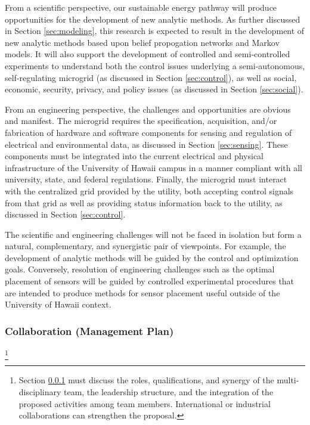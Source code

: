 From a scientific perspective, our sustainable energy pathway will produce
opportunities for the development of new analytic methods.  As further
discussed in Section \ref{sec:modeling}, this research is expected to
result in the development of new analytic methods based upon belief
propogation networks and Markov models.  It will also support the
development of controlled and semi-controlled experiments to understand both
the control issues underlying a semi-autonomous, self-regulating microgrid
(as discussed in Section \ref{sec:control}), as well as social, economic,
security, privacy, and policy issues (as discussed in Section \ref{sec:social}).

From an engineering perspective, the challenges and opportunities are
obvious and manifest.  The microgrid requires the specification,
acquisition, and/or fabrication of hardware and software components for
sensing and regulation of electrical and environmental data, as discussed
in Section \ref{sec:sensing}. These components must be integrated into the
current electrical and physical infrastructure of the University of Hawaii
campus in a manner compliant with all university, state, and federal
regulations.  Finally, the microgrid must interact with the centralized
grid provided by the utility, both accepting control signals from that grid
as well as providing status information back to the utility, as discussed
in Section \ref{sec:control}.

The scientific and engineering challenges will not be faced in isolation
but form a natural, complementary, and synergistic pair of viewpoints. For
example, the development of analytic methods will be guided by the control
and optimization goals.  Conversely, resolution of engineering challenges
such as the optimal placement of sensors will be guided by controlled
experimental procedures that are intended to produce methods for sensor
placement useful outside of the University of Hawaii context.

\subsubsection{Collaboration (Management Plan)}
\label{sec:collaboration}

\footnote{Section \ref{sec:collaboration} must discuss the roles, qualifications, and
  synergy of the multi-disciplinary team, the leadership structure, and the
  integration of the proposed activities among team members.  
  International or industrial collaborations can strengthen the proposal.
}

